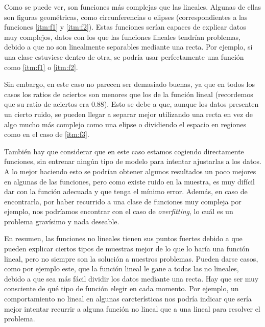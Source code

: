 \documentclass[11pt,a4paper]{article}
\begin{document}
Como se puede ver, son funciones más complejas que las lineales. Algunas de ellas son figuras
geométricas, como circunferencias o elipses (correspondientes a las funciones \ref{itm:f1} y
\ref{itm:f2}). Estas funciones serían capaces de explicar datos muy complejos, datos con los que
las funciones lineales tendrían problemas, debido a que no son linealmente separables mediante
una recta. Por ejemplo, si una clase estuviese dentro de otra, se podría usar perfectamente una
función como \ref{itm:f1} o \ref{itm:f2}.

Sin embargo, en este caso no parecen ser demasiado buenas, ya que en todos los casos los ratios
de aciertos son menores que los de la función lineal (recordemos que su ratio de aciertos era
$0.88$). Esto se debe a que, aunque los datos presenten un cierto ruido, se pueden llegar a separar
mejor utilizando una recta en vez de algo mucho más complejo como una elipse o dividiendo el espacio
en regiones como en el caso de \ref{itm:f3}.

También hay que considerar que en este caso estamos cogiendo directamente funciones, sin entrenar
ningún tipo de modelo para intentar ajustarlas a los datos. A lo mejor haciendo esto se podrían
obtener algunos resultados un poco mejores en algunas de las funciones, pero como existe ruido en la
muestra, es muy difícil dar con la función adecuada y que tenga el mínimo error. Además, en caso de
encontrarla, por haber recurrido a una clase de funciones muy compleja por ejemplo, nos podríamos
encontrar con el caso de \textit{overfitting}, lo cuál es un problema gravísimo y nada deseable.

En resumen, las funciones no lineales tienen sus puntos fuertes debido a que pueden explicar ciertos
tipos de muestras mejor de lo que lo haría una función lineal, pero no siempre son la solución a
nuestros problemas. Pueden darse casos, como por ejemplo este, que la función lineal le gane a todas
las no lineales, debido a que sea más fácil dividir los datos mediante una recta. Hay que ser muy
consciente de qué tipo de función elegir en cada momento. Por ejemplo, un comportamiento no lineal en
algunas carcterísticas nos podría indicar que sería mejor intentar recurrir a alguna función no lineal
que a una lineal para resolver el problema.
\end{document}
